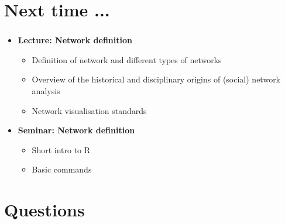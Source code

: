 \documentclass[8pt]{beamer}
\begin{document}
\section*{Next time ...}


\bgroup
{}
\begin{frame}[plain]{}
\begin{center}
\color{white}{\Huge\insertsection}
\end{center}
\end{frame}
\egroup


\begin{frame}
\frametitle{\insertsection}

\begin{itemize}
\item 	\textbf{Lecture: Network definition}
		\begin{itemize}
		\item Definition of network and different types of networks
		\item Overview of the historical and disciplinary origins of (social) network analysis
		\item Network visualisation standards
		\end{itemize}
\medskip
\medskip
\item 	\textbf{Seminar: Network definition}
		\begin{itemize}
		\item Short intro to R
		\item Basic commands 
		\end{itemize}
\end{itemize}


\end{frame}






\section*{Questions}
\end{document}
